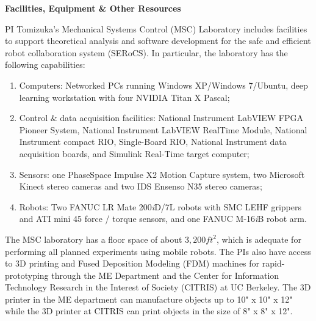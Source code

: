 
\setcounter{page}{1}

\begin{center}
\textbf{\large Facilities, Equipment \& Other Resources}
\end{center}


% 
% 

PI Tomizuka's Mechanical Systems Control (MSC) Laboratory includes facilities to support theoretical analysis and software development for the safe and efficient robot collaboration system (SERoCS). In particular, the laboratory has the following capabilities:

\begin{enumerate}
\item Computers: Networked PCs running Windows XP/Windows 7/Ubuntu, deep learning workstation with four NVIDIA Titan X Pascal;
\item Control \& data acquisition facilities: National Instrument LabVIEW FPGA Pioneer System, National Instrument LabVIEW RealTime Module, National Instrument compact RIO, Single-Board RIO, National Instrument data acquisition boards, and Simulink Real-Time target computer;
\item Sensors: one PhaseSpace Impulse X2 Motion Capture system, two Microsoft Kinect stereo cameras and two IDS Ensenso N35 stereo cameras;
\item Robots: Two FANUC LR Mate 200\textit{i}D/7L robots with SMC LEHF grippers and ATI mini 45 force / torque sensors, and one FANUC M-16\textit{i}B robot arm.\end{enumerate}
The MSC laboratory has a floor space of about $3,200 ft^2$, which is adequate for performing all planned experiments using mobile robots.
The PIs also have access to 3D printing and Fused Deposition Modeling (FDM) machines for rapid- prototyping through the ME Department and the Center for Information Technology Research in the Interest of Society (CITRIS) at UC Berkeley. The 3D printer in the ME department can manufacture objects up to 10" x 10" x 12" while the 3D printer at CITRIS can print objects in the size of 8" x 8" x 12".
